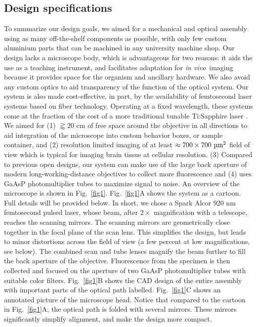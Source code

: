 \documentclass[10pt,letterpaper]{article}
\newcommand{\invivo}{\textit{in vivo}~}
\begin{document}
\subsection*{Design specifications}
To summarize our design goals, we aimed for a mechanical and optical assembly using as many off-the-shelf components as possible, with only few custom aluminium parts that can be machined in any university machine shop. Our design lacks a microscope body, which is  advantageous for two reasons: it aids the use as a teaching instrument, and facilitates adaptation for \invivo imaging because it provides space for the organism and ancillary hardware. We also avoid any custom optics to aid transparency of the function of the optical system. Our system is also made cost-effective, in part, by the availability of femtosecond laser systems based on fiber technology. Operating at a fixed wavelength, these systems come at the fraction of the cost of a more traditional tunable Ti:Sapphire laser \cite{Bueno2019}.\newline
We aimed for (1) $\gtrapprox20\text{ cm}$ of free space around the objective in all directions to aid integration of the microscope into custom behavior boxes, or sample container, and (2) resolution limited imaging of at least $\approx 700\times 700\text{ \textmu m}^2$ field of view which is typical for imaging brain tissue at cellular resolution. (3) Compared to previous open designs\cite{Rosenegger2014, Mayrhofer2015}, our system can make use of the large back aperture of modern long-working-distance objectives to collect more fluorescence and (4) uses GaAsP photomultiplier tubes to maximize signal to noise.\newline
An overview of the microscope is shown in Fig.~\ref{fig1}. Fig.~\ref{fig1}A shows the system as a cartoon. Full details will be provided below. In short, we chose a Spark Alcor 920 nm femtosecond pulsed laser, whose beam, after $2\times$ magnification with a telescope, reaches the scanning mirrors. The scanning mirrors are geometrically close together in the focal plane of the scan lens. This simplifies the design, but leads to minor distortions across the field of view (a few percent at low magnifications, see below). The combined scan and tube lenses magnify the beam further to fill the back aperture of the objective. Fluorescence from the specimen is then collected and focused on the aperture of two GaAsP photomultiplier tubes with suitable color filters. Fig.~\ref{fig1}B shows the CAD design of the entire assembly with important parts of the optical path labelled. Fig.~\ref{fig1}C shows an annotated picture of the microscope head. Notice that compared to the cartoon in Fig.~\ref{fig1}A, the optical path is folded with several mirrors. These mirrors significantly simplify alignment, and make the design more compact.
\end{document}
